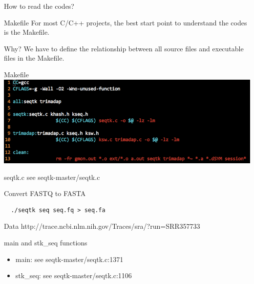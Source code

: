 \documentclass[UTF8]{beamer}
\begin{document}
\begin{frame}[t]{How to read the codes?}
\begin{block}{Makefile}
  For most C/C++ projects, the best start point to understand the codes is the
  Makefile.
\end{block}

\begin{block}{Why?}
  We have to define the relationship between all source files and executable
  files in the Makefile.
\end{block}

\end{frame}

\begin{frame}[t]{Makefile}
\includegraphics[width=\textwidth]{seqtkmakefile.png}
\end{frame}

\begin{frame}[t]{seqtk.c}
  see seqtk-master/seqtk.c
\end{frame}

\begin{frame}[t, fragile]{Convert FASTQ to FASTA}
\begin{verbatim}
  ./seqtk seq seq.fq > seq.fa
\end{verbatim}
\begin{block}{Data}
  http://trace.ncbi.nlm.nih.gov/Traces/sra/?run=SRR357733
\end{block}
\end{frame}

\begin{frame}[t]{main and stk_seq functions}
  \begin{itemize}
    \item main: see seqtk-master/seqtk.c:1371
    \item stk_seq: see seqtk-master/seqtk.c:1106
  \end{itemize}
\end{frame}
\end{document}
